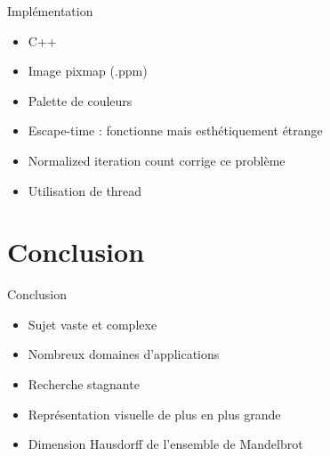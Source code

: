 \documentclass{beamer}
\begin{document}
\begin{frame}{Implémentation}
\begin{block}{}
    \begin{itemize}
        \item C++
        \item Image pixmap (.ppm)
        \item Palette de couleurs
        \item Escape-time : fonctionne mais esthétiquement étrange
        \item Normalized iteration count corrige ce problème
        \item Utilisation de thread
    \end{itemize}
\end{block}
\end{frame}

\section{Conclusion}
\begin{frame}{Conclusion}
\begin{block}{}
    \begin{itemize}
        \item Sujet vaste et complexe
        \item Nombreux domaines d'applications
        \item Recherche stagnante
        \item Représentation visuelle de plus en plus grande
        \item Dimension Hausdorff de l'ensemble de Mandelbrot
    \end{itemize}
\end{block}
\end{frame}
\end{document}
